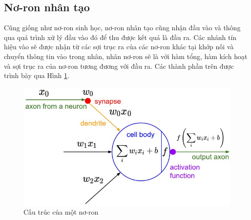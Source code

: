 \subsection{Nơ-ron nhân tạo}
\label{sec:neuralStruct}
Cũng giống như nơ-ron sinh học, nơ-ron nhân tạo cũng nhận đầu vào và thông qua quá trình xử lý đầu vào đó để thu được kết quả là đầu ra. Các nhánh tín hiệu vào sẽ được nhận từ các sợi trục ra của các nơ-ron khác tại khớp nối và chuyển thông tin vào trong nhân, nhân nơ-ron sẽ là với hàm tổng, hàm kích hoạt và sợi trục ra của nơ-ron tương đương với đầu ra. Các thành phần trên được trình bày qua Hình \ref{fig:aNeural}. 
    \begin{figure}[H]
    \begin{center}
     \includegraphics[scale=0.5]{chap3/image/neuron.jpeg}
    \end{center}
    \caption[]{Cấu trúc của một nơ-ron \protect \footnotemark}
 	\label{fig:aNeural}
    \end{figure}
